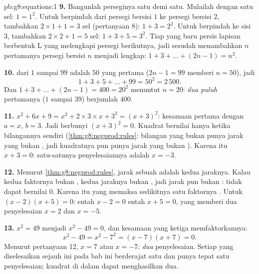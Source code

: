 \begin{solution}{pb:g8:equations:1}
\textbf{9.} Bangunlah perseginya satu demi satu. Mulailah dengan satu
sel: $1 = 1^2$. Untuk berpindah dari persegi bersisi $1$ ke persegi
bersisi $2$, tambahkan $2 \times 1 + 1 = 3$ sel (pertanyaan
8): $1 + 3 = 2^2$. Untuk berpindah ke sisi $3$, tambahkan
$2 \times 2 + 1 = 5$ sel: $1 + 3 + 5 = 3^2$. Tiap 
yang baru persis lapisan berbentuk L yang melengkapi persegi
berikutnya, jadi sesudah menambahkan $n$  pertamanya
persegi bersisi $n$ menjadi lengkap: $1 + 3 + \dots + (2n - 1) = n^2$.

\textbf{10.}  dari $1$ sampai $99$ adalah $50$ yang
pertama ($2n - 1 = 99$ memberi $n = 50$), jadi
\[
1 + 3 + 5 + \dots + 99 = 50^2 = 2\,500 .
\]
Dan $1 + 3 + \dots + (2n - 1) = 400 = 20^2$ menuntut $n = 20$:
\emph{dua puluh}  pertamanya ($1$ sampai $39$)
berjumlah $400$.

\textbf{11.} $x^2 + 6x + 9 = x^2 + 2 \times 3 \times x + 3^2 =
(x + 3)^2$: kesamaan pertama dengan $a = x$, $b = 3$. Jadi
 berbunyi $(x + 3)^2 = 0$. Kuadrat bernilai  hanya
ketika bilangannya sendiri  (\cref{thm:g8:negprod:rules}: bilangan
yang bukan  punya jarak yang bukan , jadi kuadratnya pun punya
jarak yang bukan ). Karena itu $x + 3 = 0$: satu-satunya
penyelesaiannya adalah $x = -3$.

\textbf{12.} Menurut \cref{thm:g8:negprod:rules}, jarak sebuah
 adalah  kedua jaraknya. Kalau kedua faktornya
bukan , kedua jaraknya bukan , jadi jarak  pun
bukan :  tidak dapat bernilai $0$. Karena itu  yang  memaksa sedikitnya satu faktornya . Untuk
$(x - 2)(x + 5) = 0$: entah $x - 2 = 0$ entah $x + 5 = 0$, yang
memberi dua penyelesaian $x = 2$ dan $x = -5$.

\textbf{13.} $x^2 = 49$ menjadi $x^2 - 49 = 0$, dan kesamaan yang
ketiga memfaktorkannya:
\[
x^2 - 49 = x^2 - 7^2 = (x - 7)(x + 7) = 0 .
\]
Menurut pertanyaan 12, $x = 7$ atau $x = -7$: \emph{dua}
penyelesaian. Setiap  yang diselesaikan sejauh ini pada bab
ini berderajat satu dan punya tepat satu penyelesaian; kuadrat di
dalam  dapat menghasilkan dua.


\end{solution}
